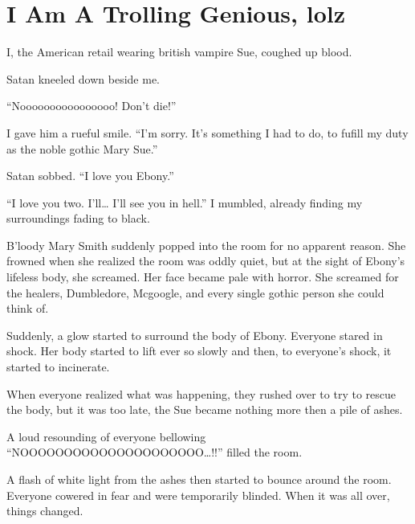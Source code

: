 \section{I Am A Trolling Genious, lolz}



I, the American retail wearing british vampire Sue, coughed up blood.

Satan kneeled down beside me.

\enquote{Noooooooooooooooo! Don't die!}

I gave him a rueful smile. \enquote{I'm sorry. It's something I had to do, to fufill my duty as the noble gothic Mary Sue.}

Satan sobbed. \enquote{I love you Ebony.}

\enquote{I love you two. I'll\ldots{} I'll see you in hell.} I mumbled, already finding my surroundings fading to black.

B'loody Mary Smith suddenly popped into the room for no apparent reason. She frowned when she realized the room was oddly quiet, but at the sight of Ebony's lifeless body, she screamed. Her face became pale with horror. She screamed for the healers, Dumbledore, Mcgoogle, and every single gothic person she could think of.

Suddenly, a glow started to surround the body of Ebony. Everyone stared in shock. Her body started to lift ever so slowly and then, to everyone's shock, it started to incinerate.

When everyone realized what was happening, they rushed over to try to rescue the body, but it was too late, the Sue became nothing more then a pile of ashes.

A loud resounding of everyone bellowing \enquote{NOOO\-O\-O\-O\-O\-O\-O\-O\-O\-O\-O\-O\-O\-O\-OOOOO\ldots{}!!} filled the room.

A flash of white light from the ashes then started to bounce around the room. Everyone cowered in fear and were temporarily blinded. When it was all over, things changed.

